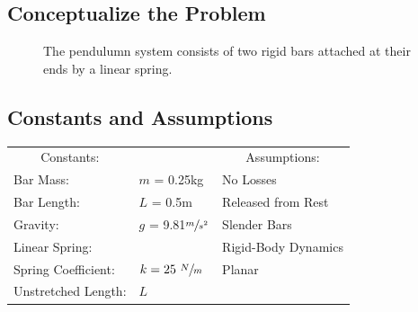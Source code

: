 \documentclass[12pt]{report}
\begin{document}

{\tableofcontents\let\clearpage\relax\listoffigures}
\clearpage
{}
\newpage
\begin{flushleft}
\section{Conceptualize the Problem}

\begin{figure}[h]
  \begin{minipage}[c]{.4\textwidth}
  
\end{minipage}%
\begin{minipage}[c]{.6\textwidth}
  The pendulumn system consists of two rigid bars attached at their ends by a linear spring.
\end{minipage}
\end{figure}

\subsection{Constants and Assumptions}
\begin{tabular}{ll@{\hskip .75in}l}
 \multicolumn{1}{c}{Constants:} && \multicolumn{1}{c}{Assumptions:} \\
 Bar Mass: &$m$ = 0.25kg & No Losses\\
 Bar Length: &$L$ = 0.5m & Released from Rest\\
 Gravity: &$g$ = 9.81$\sfrac{m}{s^2}$ &Slender Bars \\
 Linear Spring: &&Rigid-Body Dynamics\\
 \quad Spring Coefficient:& $k = 25~\sfrac{N}{m}$ & Planar\\
 \quad Unstretched Length:& $L$ \\
\end{tabular}
\vspace{5ex}


\end{flushleft}
\end{document}
